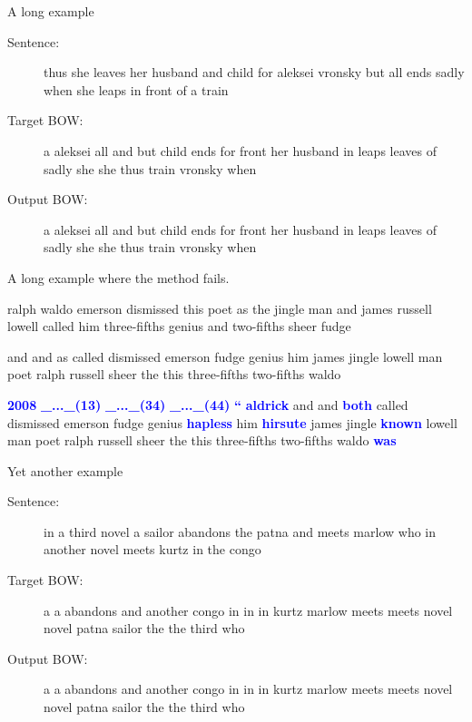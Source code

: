 \documentclass[]{beamer}
\begin{document}
\begin{frame}{A long example}
	\begin{description}
		\item[Sentence:] thus she leaves her husband and child for aleksei vronsky but all ends sadly when she leaps in front of a train
		\item[Target BOW:] a    aleksei all and but child   ends    for front   her husband in  leaps   leaves  of  sadly   she she thus    train   vronsky when
		\item[Output BOW:] a    aleksei all and but child   ends    for front   her husband in  leaps   leaves  of  sadly   she she thus    train   vronsky when
	\end{description}
\end{frame}

\begin{frame}[fragile]{A long example where the method fails.}
	\begin{description}
		\let\oldtextbf\textbf
		\renewcommand{\textbf}[1]{\textcolor{blue}{\oldtextbf{#1}}}
		\renewcommand{\emph}[1]{\textcolor{red}{\cancel{#1}}} %
		\item[Sentence:] ralph waldo emerson dismissed this poet as the jingle man and james russell lowell called him three-fifths genius and two-fifths sheer fudge
		\item[Target BOW:] and  and  as  called  dismissed  emerson  fudge  genius  him  james  jingle  lowell  man  poet  ralph  russell  sheer  the  this  three-fifths  two-fifths  waldo
		\item[Output BOW:] \textbf{2008}   \textbf{\_...\_(13)}   \textbf{\_...\_(34)}   \textbf{\_...\_(44)}  \textbf{``}   \textbf{aldrick}   and and  \emph{as}   \textbf{both}   called   dismissed   emerson   fudge   genius   \textbf{hapless}   him   \textbf{hirsute}   james   jingle   \textbf{known}   lowell   man   poet   ralph   russell   sheer   the   this   three-fifths   two-fifths   waldo   \textbf{was}   
	\end{description}
\end{frame}


\begin{frame}{Yet another example}
	\begin{description}
		\item[Sentence:] in a third novel a sailor abandons the patna and meets marlow who in another novel meets kurtz in the congo
		\item[Target BOW:] a    a   abandons    and another congo   in  in  in  kurtz   marlow  meets   meets   novel   novel   patna   sailor  the the third   who
		\item[Output BOW:] a    a   abandons    and another congo   in  in  in  kurtz   marlow  meets   meets   novel   novel   patna   sailor  the the third   who
	\end{description}
\end{frame}
\end{document}
